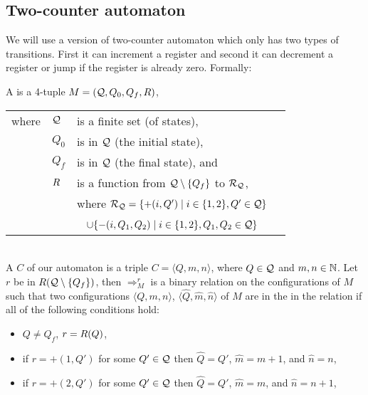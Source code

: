 \subsection{Two-counter automaton} %
We will use a version of two-counter automaton which only has two types of transitions. First it can increment a register and second it can decrement a register or jump if the register is already zero. Formally:
\begin{definition}\label{def.2.24}
	A  is a 4-tuple $M=(\mathcal{Q},Q_0,Q_f,R)$,
	\begin{tabular}{llp{0.78\linewidth}}
		where & $\mathcal{Q}$ & is a finite set (of states),                                                                           \\
& $Q_0$        & is in $\mathcal{Q}$ (the initial state),                                                                \\
& $Q_f$        & is in $\mathcal{Q}$ (the final state), and                                                              \\
& $R$  & is a function from $\mathcal{Q}\setminus\{Q_f\}$ to $\mathcal{R}_\autStates$,                           \\
&              & where $\mathcal{R}_{\mathcal{Q}}=\{+(i,Q')\mid i\in\{1,2\},Q'\in\mathcal{Q}\}$                             \\
&              & ~ \hphantom{where $\mathcal{R}_\autStates$}$\cup\{-(i,Q_1,Q_2)\mid i\in\{1,2\},Q_1,Q_2\in\mathcal{Q}\}$ 
	\end{tabular}\\
	A  $C$ of our automaton is a triple $C=\langle Q,m,n\rangle$, where $Q\in\mathcal{Q}$ and $m,n\in\mathbb{N}$.
	Let $r$ be in $R(\mathcal{Q}\setminus\{Q_f\})$, then $\Rightarrow^r_M$ is a binary relation on the configurations of $M$ such that two configurations $\langle Q,m,n\rangle$, $\langle \widehat{Q},\widehat{m},\widehat{n}\rangle$ of $M$ are in the in the relation if all of the following conditions hold:
	\begin{itemize}
		\item $Q\neq Q_f$, $r=R(Q)$,
		\item if $r=+(1,Q')$ for some $Q'\in \mathcal{Q}$ then $\widehat{Q}=Q'$, $\widehat{m}=m+1$, and $\widehat{n}=n$,
		\item if $r=+(2,Q')$ for some $Q'\in \mathcal{Q}$ then $\widehat{Q}=Q'$, $\widehat{m}=m$, and $\widehat{n}=n+1$,

\end{itemize}
\end{definition}
